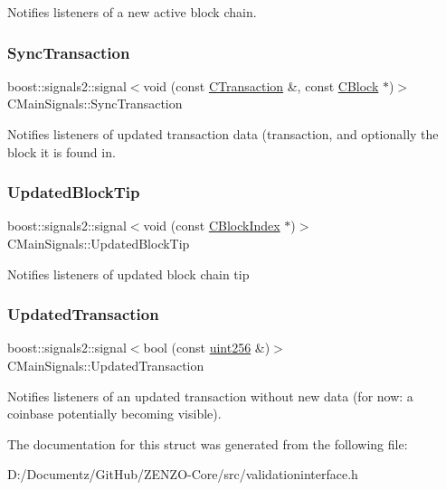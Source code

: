 Notifies listeners of a new active block chain. \mbox{\label{struct_c_main_signals_a7ced7f332ed90d57110a78ad50d5a60f}} 
\subsubsection{\texorpdfstring{SyncTransaction}{SyncTransaction}}
{\footnotesize\ttfamily boost\+::signals2\+::signal$<$void (const \mbox{\hyperlink{class_c_transaction}{C\+Transaction}} \&, const \mbox{\hyperlink{class_c_block}{C\+Block}} $\ast$)$>$ C\+Main\+Signals\+::\+Sync\+Transaction}

Notifies listeners of updated transaction data (transaction, and optionally the block it is found in. \mbox{\label{struct_c_main_signals_a0380ea185992a8ee3572b5cf2aaa7677}} 
\subsubsection{\texorpdfstring{UpdatedBlockTip}{UpdatedBlockTip}}
{\footnotesize\ttfamily boost\+::signals2\+::signal$<$void (const \mbox{\hyperlink{class_c_block_index}{C\+Block\+Index}} $\ast$)$>$ C\+Main\+Signals\+::\+Updated\+Block\+Tip}

Notifies listeners of updated block chain tip \mbox{\label{struct_c_main_signals_a5c4626fe1ae15530b27a29cde74ed9c2}} 
\subsubsection{\texorpdfstring{UpdatedTransaction}{UpdatedTransaction}}
{\footnotesize\ttfamily boost\+::signals2\+::signal$<$bool (const \mbox{\hyperlink{classuint256}{uint256}} \&)$>$ C\+Main\+Signals\+::\+Updated\+Transaction}

Notifies listeners of an updated transaction without new data (for now\+: a coinbase potentially becoming visible). 

The documentation for this struct was generated from the following file\+:\begin{DoxyCompactItemize}
\item 
D\+:/\+Documentz/\+Git\+Hub/\+Z\+E\+N\+Z\+O-\/\+Core/src/validationinterface.\+h\end{DoxyCompactItemize}

